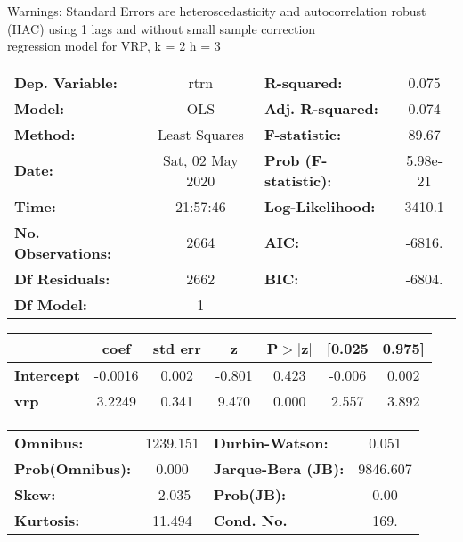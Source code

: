 Warnings: \newline
 [1] Standard Errors are heteroscedasticity and autocorrelation robust (HAC) using 1 lags and without small sample correction\\ 

regression model for VRP, k = 2 h = 3\begin{center}
\begin{tabular}{lclc}
\toprule
\textbf{Dep. Variable:}    &       rtrn       & \textbf{  R-squared:         } &     0.075   \\
\textbf{Model:}            &       OLS        & \textbf{  Adj. R-squared:    } &     0.074   \\
\textbf{Method:}           &  Least Squares   & \textbf{  F-statistic:       } &     89.67   \\
\textbf{Date:}             & Sat, 02 May 2020 & \textbf{  Prob (F-statistic):} &  5.98e-21   \\
\textbf{Time:}             &     21:57:46     & \textbf{  Log-Likelihood:    } &    3410.1   \\
\textbf{No. Observations:} &        2664      & \textbf{  AIC:               } &    -6816.   \\
\textbf{Df Residuals:}     &        2662      & \textbf{  BIC:               } &    -6804.   \\
\textbf{Df Model:}         &           1      & \textbf{                     } &             \\
\bottomrule
\end{tabular}
\begin{tabular}{lcccccc}
                   & \textbf{coef} & \textbf{std err} & \textbf{z} & \textbf{P$> |$z$|$} & \textbf{[0.025} & \textbf{0.975]}  \\
\midrule
\textbf{Intercept} &      -0.0016  &        0.002     &    -0.801  &         0.423        &       -0.006    &        0.002     \\
\textbf{vrp}       &       3.2249  &        0.341     &     9.470  &         0.000        &        2.557    &        3.892     \\
\bottomrule
\end{tabular}
\begin{tabular}{lclc}
\textbf{Omnibus:}       & 1239.151 & \textbf{  Durbin-Watson:     } &    0.051  \\
\textbf{Prob(Omnibus):} &   0.000  & \textbf{  Jarque-Bera (JB):  } & 9846.607  \\
\textbf{Skew:}          &  -2.035  & \textbf{  Prob(JB):          } &     0.00  \\
\textbf{Kurtosis:}      &  11.494  & \textbf{  Cond. No.          } &     169.  \\
\bottomrule
\end{tabular}
\end{center}

